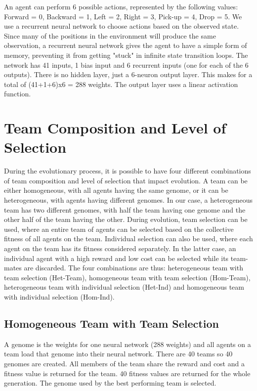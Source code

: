 \documentclass[12pt]{article}
\begin{document}
An agent can perform 6 possible actions, represented by the following values: Forward = 0, Backward = 1, Left = 2, Right = 3, Pick-up = 4, Drop = 5.
We use a recurrent neural network to choose actions based on the observed state.
Since many of the positions in the environment will produce the same observation, a recurrent neural network gives the agent to have a simple form of memory, preventing it from getting "stuck" in infinite state transition loops.
The network has 41 inputs, 1 bias input and 6 recurrent inputs (one for each of the 6 outputs). 
There is no hidden layer, just a 6-neuron output layer. 
This makes for a total of (41+1+6)x6 = 288 weights. 
The output layer uses a linear activation function.

\section{Team Composition and Level of Selection}

During the evolutionary process, it is possible to have four different combinations of team composition and level of selection that impact evolution.
A team can be either homogeneous, with all agents having the same genome, or it can be heterogeneous, with agents having different genomes.
In our case, a heterogeneous team has two different genomes, with half the team having one genome and the other half of the team having the other.
During evolution, team selection can be used, where an entire team of agents can be selected based on the collective fitness of all agents on the team.
Individual selection can also be used, where each agent on the team has its fitness considered separately.
In the latter case, an individual agent with a high reward and low cost can be selected while its team-mates are discarded. 
The four combinations are thus: heterogeneous team with team selection (Het-Team), homogeneous team with team selection (Hom-Team), heterogeneous team with individual selection (Het-Ind) and homogeneous team with individual selection (Hom-Ind).\\


\subsection{Homogeneous Team with Team Selection}

A genome is the weights for one neural network (288 weights) and all agents on a team load that genome into their neural network.
There are 40 teams so 40 genomes are created. 
All members of the team share the reward and cost and a fitness value is returned for the team.
40 fitness values are returned for the whole generation. 
The genome used by the best performing team is selected.\\
\end{document}

